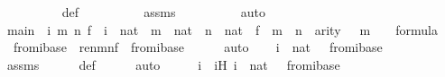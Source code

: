 \begin{isabellebody}
\ \ \ \ \ \ \ \ \isamarkupfalse%
\ {\isasymDelta}{}{\isacharunderscore}{\kern0pt}def\isanewline
\ \ \ \ \ \ \ \ \isamarkupfalse%
\ assms{}\isanewline
\ \ \ \ \ \ \ \ \isamarkupfalse%
\ auto\isanewline
\ \ \ \ \isamarkupfalse%
\isanewline
\ \ \isamarkupfalse%
\isanewline
\ \ \isamarkupfalse%
\ \isamarkupfalse%
\ main\ {\isacharcolon}{\kern0pt}\ {\isachardoublequoteopen}{\isasymAnd}i\ m\ n\ f\ {\isasymphi}{\isachardot}{\kern0pt}\ i\ {\isasymin}\ nat\ {\isasymLongrightarrow}\ m\ {\isasymin}\ nat\ {\isasymLongrightarrow}\ n\ {\isasymin}\ nat\ {\isasymLongrightarrow}\ f\ {\isasymin}\ m\ {\isasymrightarrow}\ n\ {\isasymLongrightarrow}\ arity{\isacharparenleft}{\kern0pt}{\isasymphi}{\isacharparenright}{\kern0pt}\ {\isasymle}\ \ m\ {\isasymLongrightarrow}\ {\isasymphi}\ {\isasymin}\ formula\ {\isasymLongrightarrow}\ {\isasymphi}\ {\isasymin}\ {\isasymDelta}{}{\isacharunderscore}{\kern0pt}from{\isacharcircum}{\kern0pt}i{\isacharparenleft}{\kern0pt}{\isasymDelta}{}{\isacharunderscore}{\kern0pt}base{\isacharparenright}{\kern0pt}\ {\isasymLongrightarrow}\ ren{\isacharparenleft}{\kern0pt}{\isasymphi}{\isacharparenright}{\kern0pt}{\isacharbackquote}{\kern0pt}m{\isacharbackquote}{\kern0pt}n{\isacharbackquote}{\kern0pt}f\ {\isasymin}\ {\isasymDelta}{}{\isacharunderscore}{\kern0pt}from{\isacharcircum}{\kern0pt}i{\isacharparenleft}{\kern0pt}{\isasymDelta}{}{\isacharunderscore}{\kern0pt}base{\isacharparenright}{\kern0pt}{\isachardoublequoteclose}\isanewline
\ \ \ \ \isamarkupfalse%
\ auto\isanewline
\isanewline
\ \ \isamarkupfalse%
\ {\isachardoublequoteopen}{\isasymexists}i\ {\isasymin}\ nat{\isachardot}{\kern0pt}\ {\isasymphi}\ {\isasymin}\ {\isasymDelta}{}{\isacharunderscore}{\kern0pt}from{\isacharcircum}{\kern0pt}i{\isacharparenleft}{\kern0pt}{\isasymDelta}{}{\isacharunderscore}{\kern0pt}base{\isacharparenright}{\kern0pt}{\isachardoublequoteclose}\ \isanewline
\ \ \ \ \isamarkupfalse%
\ assms\isanewline
\ \ \ \ \isamarkupfalse%
\ {\isasymDelta}{}{\isacharunderscore}{\kern0pt}def\isanewline
\ \ \ \ \isamarkupfalse%
\ auto\isanewline
\ \ \isamarkupfalse%
\ \isamarkupfalse%
\ i\ \ iH{\isacharcolon}{\kern0pt}\ {\isachardoublequoteopen}i\ {\isasymin}\ nat{\isachardoublequoteclose}\ {\isachardoublequoteopen}{\isasymphi}\ {\isasymin}\ {\isasymDelta}{}{\isacharunderscore}{\kern0pt}from{\isacharcircum}{\kern0pt}i{\isacharparenleft}{\kern0pt}{\isasymDelta}{}{\isacharunderscore}{\kern0pt}base{\isacharparenright}{\kern0pt}{\isachardoublequoteclose}\ \isamarkupfalse%

\end{isabellebody}
